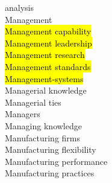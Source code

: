 \documentclass[a4paper]{article}
\begin{document}
\begin{multicols*}{2}
\begin{footnotesize}
analysis \\ Management \\ \hl{Management capability} \\ \hl{Management leadership} \\ \hl{Management research} \\ \hl{Management standards} \\ \hl{Management-systems} \\ Managerial knowledge \\ Managerial ties \\ Managers \\ Managing knowledge \\ Manufacturing firms \\ Manufacturing flexibility \\ Manufacturing performance \\ Manufacturing practices \
\end{footnotesize}
\end{multicols*}
\end{document}
